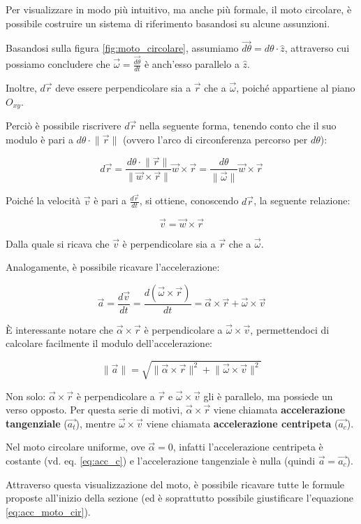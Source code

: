 \documentclass[oneside]{book}
\newcommand{\norm}[1]{\lVert \vec{#1} \rVert}
\newcommand{\nnorm}[1]{\lVert #1 \rVert}
\begin{document}
Per visualizzare in modo più intuitivo, ma anche più formale, il
moto circolare, è possibile costruire un sistema di riferimento
basandosi su alcune assunzioni.

Basandosi sulla figura \ref{fig:moto_circolare}, assumiamo
$\vec{d\theta} = d\theta \cdot \hat{z}$, attraverso cui
possiamo concludere che $\vec{\omega}=\frac{\vec{d\theta}}{dt}$ è anch'esso
parallelo a $\hat{z}$.

Inoltre, $d\vec{r}$ deve essere perpendicolare sia a $\vec{r}$ che
a $\vec{\omega}$, poiché appartiene al piano $O_{xy}$.

Perciò è possibile riscrivere $d\vec{r}$ nella seguente forma, tenendo
conto che il suo modulo è pari a $d\theta \cdot \norm{r}$ (ovvero
l'arco di circonferenza percorso per $d\theta$):

\begin{equation*}
    d\vec{r}=\frac{d\theta \cdot \norm{r}}{\lVert \vec{w} \times
    \vec{r} \rVert} \vec{w} \times \vec{r} =
    \frac{d\theta}{\norm{\omega}} \vec{w} \times \vec{r}
\end{equation*}

Poiché la velocità $\vec{v}$ è pari a $\frac{d\vec{r}}{dt}$, si ottiene,
conoscendo $d\vec{r}$, la seguente relazione:

\begin{equation}
    \vec{v}=\vec{w}\times\vec{r}
\end{equation}

Dalla quale si ricava che $\vec{v}$ è perpendicolare sia a $\vec{r}$ che
a $\vec{\omega}$.

Analogamente, è possibile ricavare l'accelerazione:

\begin{equation}
    \vec{a}=\frac{d\vec{v}}{dt}=\frac{d(\vec{\omega}
    \times \vec{r})}{dt}=\vec{\alpha} \times \vec{r}
    + \vec{\omega} \times \vec{v}
\end{equation}

È interessante notare che $\vec{\alpha} \times \vec{r}$
è perpendicolare a $\vec{\omega} \times \vec{v}$, permettendoci
di calcolare facilmente il modulo dell'accelerazione:

\begin{equation}
    \norm{a} = \sqrt{\nnorm{\vec{\alpha} \times \vec{r}}^2 + \nnorm{\vec{\omega} \times \vec{v}}^2}
\end{equation}

Non solo: $\vec{\alpha} \times \vec{r}$ è perpendicolare a $\vec{r}$ e
$\vec{\omega} \times \vec{v}$ gli è parallelo, ma possiede un verso opposto.
Per questa serie di motivi, $\vec{\alpha} \times \vec{r}$ viene chiamata
\textbf{accelerazione tangenziale} ($\vec{a_t}$), mentre
$\vec{\omega} \times \vec{v}$ viene chiamata \textbf{accelerazione centripeta}
($\vec{a_c}$).

Nel moto circolare uniforme, ove $\vec{\alpha}=0$, infatti l'accelerazione
centripeta è costante (vd. eq. \ref{eq:acc_c}) e l'accelerazione
tangenziale è nulla (quindi $\vec{a}=\vec{a_c}$).

Attraverso questa visualizzazione del moto, è possibile ricavare tutte
le formule proposte all'inizio della sezione (ed è soprattutto
possibile giustificare l'equazione \ref{eq:acc_moto_cir}).
\end{document}

